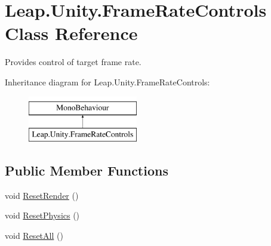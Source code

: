 \hypertarget{class_leap_1_1_unity_1_1_frame_rate_controls}{}\section{Leap.\+Unity.\+Frame\+Rate\+Controls Class Reference}
\label{class_leap_1_1_unity_1_1_frame_rate_controls}


Provides control of target frame rate.  


Inheritance diagram for Leap.\+Unity.\+Frame\+Rate\+Controls\+:\begin{figure}[H]
\begin{center}
\leavevmode
\includegraphics[height=2.000000cm]{class_leap_1_1_unity_1_1_frame_rate_controls}
\end{center}
\end{figure}
\subsection*{Public Member Functions}
\begin{DoxyCompactItemize}
\item 
void \mbox{\hyperlink{class_leap_1_1_unity_1_1_frame_rate_controls_a6125da967c18fa39cd9440369460162c}{Reset\+Render}} ()
\item 
void \mbox{\hyperlink{class_leap_1_1_unity_1_1_frame_rate_controls_a6dc62680fcbd63148da9ffb4c8a96907}{Reset\+Physics}} ()
\item 
void \mbox{\hyperlink{class_leap_1_1_unity_1_1_frame_rate_controls_a3470f5917df3d9d796c5dbdc3e2e345c}{Reset\+All}} ()
\end{DoxyCompactItemize}

